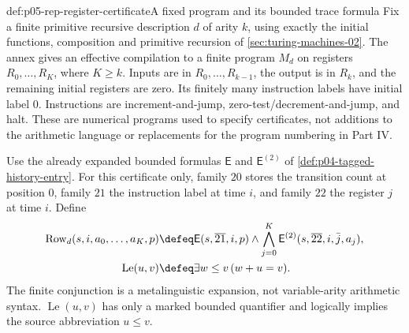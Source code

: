 \begin{hbdefinition}{def:p05-rep-register-certificate}{A fixed program and its bounded trace formula}
Fix a finite primitive recursive description \(d\) of arity \(k\),
using exactly the initial functions, composition and primitive recursion
of \cref{sec:turing-machines-02}. The annex gives an effective compilation
to a finite program \(M_d\) on registers \(R_0,\ldots,R_K\), where
\(K\geq k\). Inputs are in \(R_0,\ldots,R_{k-1}\), the output is in
\(R_k\), and the remaining initial registers are zero.
Its finitely many instruction labels have initial label \(0\).
Instructions are increment-and-jump, zero-test/decrement-and-jump, and halt.
These are numerical programs used to specify certificates, not additions
to the arithmetic language or replacements for the program numbering in
Part IV.

Use the already expanded bounded formulas \(\mathsf E\) and
\(\mathsf E^{(2)}\) of \cref{def:p04-tagged-history-entry}. For this
certificate only, family \(20\) stores the transition count at position
\(0\), family \(21\) the instruction label at time \(i\), and family
\(22\) the register \(j\) at time \(i\). Define
\[
\begin{aligned}
 \operatorname{Row}_d(s,i,a_0,\ldots,a_K,p)
 &\defeq \mathsf E(s,\overline{21},i,p)\land
       \bigwedge_{j=0}^K\mathsf E^{(2)}(s,\overline{22},i,\bar j,a_j),\\
 \operatorname{Le}(u,v)&\defeq\exists w\leq v\,(w+u=v).
\end{aligned}
\]
The finite conjunction is a metalinguistic expansion, not variable-arity
arithmetic syntax. \(\operatorname{Le}(u,v)\) has only a marked bounded
quantifier and logically implies the source abbreviation \(u\leq v\).


\end{hbdefinition}
